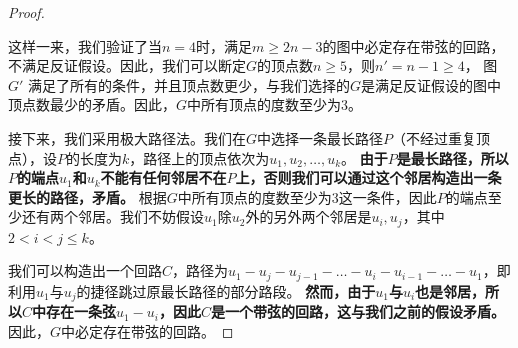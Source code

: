 \documentclass[utf8]{ctexart}
\theoremstyle{mystyle}
\begin{document}
\begin{proof}
\begin{center}
\end{center}
这样一来，我们验证了当$n=4$时，满足$m \geq 2n - 3$的图中必定存在带弦的回路，不满足反证假设。因此，我们可以断定$G$的顶点数$n \geq 5$，则$n' = n-1 \geq 4$，
图$G'$ 满足了所有的条件，并且顶点数更少，与我们选择的$G$是满足反证假设的图中顶点数最少的矛盾。因此，$G$中所有顶点的度数至少为3。

接下来，我们采用极大路径法。我们在$G$中选择一条最长路径$P$（不经过重复顶点），设$P$的长度为$k$，路径上的顶点依次为$u_1, u_2, \ldots, u_k$。
\textbf{由于$P$是最长路径，所以$P$的端点$u_1$和$u_k$不能有任何邻居不在$P$上，否则我们可以通过这个邻居构造出一条更长的路径，矛盾。}
根据$G$中所有顶点的度数至少为3这一条件，因此$P$的端点至少还有两个邻居。我们不妨假设$u_1$除$u_2$外的另外两个邻居是$u_{i}, u_{j}$，其中$2 < i < j \leq k$。

我们可以构造出一个回路$C$，路径为$u_1 - u_j - u_{j-1} - \ldots - u_i - u_{i-1} - \ldots - u_1$，即利用$u_1$与$u_j$的捷径跳过原最长路径的部分路段。
\textbf{然而，由于$u_1$与$u_i$也是邻居，所以$C$中存在一条弦$u_1-u_i$，因此$C$是一个带弦的回路，这与我们之前的假设矛盾。}因此，$G$中必定存在带弦的回路。
\end{proof}
\end{document}
